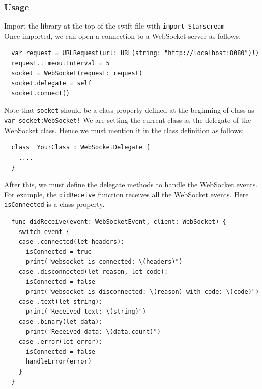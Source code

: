 \documentclass[12pt, conference, a4paper]{article}
\begin{document}
\subsubsection{Usage}
Import the library at the top of the swift file with \texttt{import Starscream}\\
Once imported, we can open a connection to a WebSocket server as follows:
\begin{verbatim}
  var request = URLRequest(url: URL(string: "http://localhost:8080")!)
  request.timeoutInterval = 5
  socket = WebSocket(request: request)
  socket.delegate = self
  socket.connect()
\end{verbatim}
Note that \texttt{socket} should be a class property defined at the beginning of class as \texttt{var socket:WebSocket!}
We are setting the current class as the delegate of the WebSocket class. Hence we must mention it in the class definition as follows:
\begin{verbatim}
  class  YourClass : WebSocketDelegate {
    ....
  }
\end{verbatim}
After this, we must define the delegate methods to handle the WebSocket events. For example, the \texttt{didReceive} function receives all the WebSocket events.
Here \texttt{isConnected} is a class property.
\begin{verbatim}
  func didReceive(event: WebSocketEvent, client: WebSocket) {
    switch event {
    case .connected(let headers):
      isConnected = true
      print("websocket is connected: \(headers)")
    case .disconnected(let reason, let code):
      isConnected = false
      print("websocket is disconnected: \(reason) with code: \(code)")
    case .text(let string):
      print("Received text: \(string)")
    case .binary(let data):
      print("Received data: \(data.count)")
    case .error(let error):
      isConnected = false
      handleError(error)
    }
  }
\end{verbatim}
\end{document}
